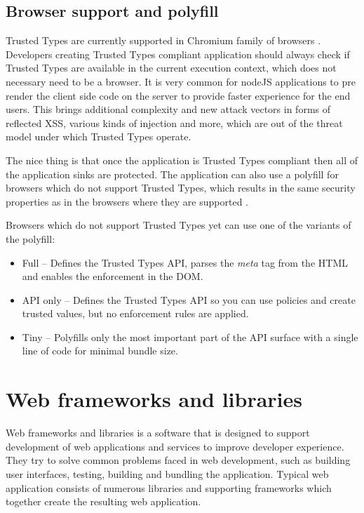 \subsection{Browser support and polyfill}

Trusted Types are currently supported in Chromium family of browsers \cite{mdn:tt_compatibility}.
Developers creating Trusted Types compliant application should always check if Trusted Types are
available in the current execution context, which does not necessary need to be a browser. It is
very common for nodeJS applications to pre render the client side code on the server to provide
faster experience for the end users. This brings additional complexity and new attack vectors in
forms of reflected XSS, various kinds of injection and more, which are out of the threat model under
which Trusted Types operate.

The nice thing is that once the application is Trusted Types compliant then all of the application
sinks are protected. The application can also use a polyfill for browsers which do not support
Trusted Types, which results in the same security properties as in the browsers where they are
supported \cite{xss_nowhere_with_polyfill}.

Browsers which do not support Trusted Types yet can use one of the variants of the polyfill:

\begin{itemize}
  \item Full -- Defines the Trusted Types API, parses the \textit{meta} tag from the HTML and
        enables the enforcement in the DOM.
  \item API only -- Defines the Trusted Types API so you can use policies and create trusted values,
        but no enforcement rules are applied.
  \item Tiny -- Polyfills only the most important part of the API surface with a single line of
        code for minimal bundle size.
\end{itemize}

\section{Web frameworks and libraries}

Web frameworks and libraries is a software that is designed to support development of web
applications and services to improve developer experience. They try to solve common problems faced
in web development, such as building user interfaces, testing, building and bundling the
application. Typical web application consists of numerous libraries and supporting frameworks which
together create the resulting web application.


